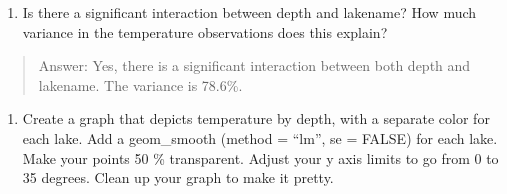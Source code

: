 \documentclass[]{article}
\newenvironment{Shaded}{\begin{snugshade}}{\end{snugshade}}
\newcommand{\CommentTok}[1]{\textcolor[rgb]{0.56,0.35,0.01}{\textit{#1}}}
\newcommand{\DataTypeTok}[1]{\textcolor[rgb]{0.13,0.29,0.53}{#1}}
\newcommand{\DecValTok}[1]{\textcolor[rgb]{0.00,0.00,0.81}{#1}}
\newcommand{\FloatTok}[1]{\textcolor[rgb]{0.00,0.00,0.81}{#1}}
\newcommand{\KeywordTok}[1]{\textcolor[rgb]{0.13,0.29,0.53}{\textbf{#1}}}
\newcommand{\NormalTok}[1]{#1}
\newcommand{\OperatorTok}[1]{\textcolor[rgb]{0.81,0.36,0.00}{\textbf{#1}}}
\newcommand{\OtherTok}[1]{\textcolor[rgb]{0.56,0.35,0.01}{#1}}
\newcommand{\StringTok}[1]{\textcolor[rgb]{0.31,0.60,0.02}{#1}}
\providecommand{\tightlist}{%
  \setlength{\itemsep}{0pt}\setlength{\parskip}{0pt}}
\begin{document}
\begin{enumerate}
\def\labelenumi{\arabic{enumi}.}
\setcounter{enumi}{6}
\tightlist
\item
  Is there a significant interaction between depth and lakename? How
  much variance in the temperature observations does this explain?
\end{enumerate}

\begin{quote}
Answer: Yes, there is a significant interaction between both depth and
lakename. The variance is 78.6\%.
\end{quote}

\begin{enumerate}
\def\labelenumi{\arabic{enumi}.}
\setcounter{enumi}{7}
\tightlist
\item
  Create a graph that depicts temperature by depth, with a separate
  color for each lake. Add a geom\_smooth (method = ``lm'', se = FALSE)
  for each lake. Make your points 50 \% transparent. Adjust your y axis
  limits to go from 0 to 35 degrees. Clean up your graph to make it
  pretty.
\end{enumerate}

\begin{Shaded}
\end{Shaded}
\end{document}
